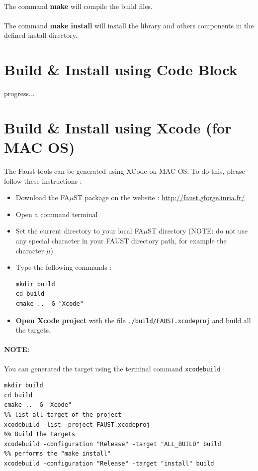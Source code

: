 \paragraph{}The command \textbf{make} will compile the build files.

\paragraph{}The command \textbf{make install} will install the library and others components in the defined install directory. 


\section{Build \& Install using Code Block}\label{sec:UnixInstallCodeBlock}
progress...

\section{Build \& Install using Xcode (for MAC OS)}\label{sec:MacInstallXcode}

The Faust tools can be generated using XCode on MAC OS. To do this, please follow these instructions :
\begin{itemize}
\item Download the FA$\mu$ST package on the website :  \url{http://faust.gforge.inria.fr/}
\item Open a command terminal
\item Set the current directory to your local FA$\mu$ST directory (NOTE: do not use any special character in your FAUST directory path, for example the character $\mu$)
\item Type the following commands : 
\begin{lstlisting}
mkdir build
cd build
cmake .. -G "Xcode"
\end{lstlisting}

\item \textbf{Open Xcode project} with the file \texttt{./build/FAUST.xcodeproj} and build all the targets.

\end{itemize}

\paragraph{NOTE:}You can generated the target using the terminal command \texttt{xcodebuild} :
\begin{lstlisting}
mkdir build
cd build
cmake .. -G "Xcode"
%% list all target of the project
xcodebuild -list -project FAUST.xcodeproj 
%% Build the targets
xcodebuild -configuration "Release" -target "ALL_BUILD" build 
%% performs the "make install"
xcodebuild -configuration "Release" -target "install" build 
\end{lstlisting}




